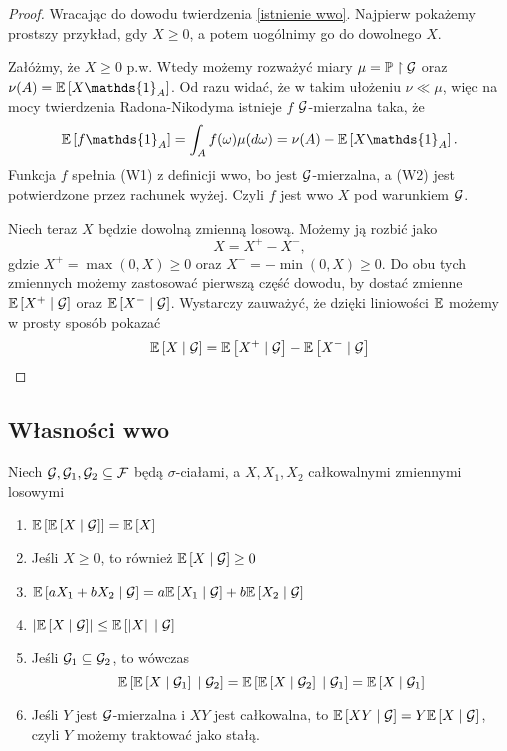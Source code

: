 \begin{proof}
  Wracając do dowodu twierdzenia \ref{istnienie wwo}. Najpierw pokażemy prostszy przykład, gdy $X\geq0$, a potem uogólnimy go do dowolnego $X$.

  Załóżmy, że $X\geq0$ p.w. Wtedy możemy rozważyć miary $\mu=\prob\restriction\set{G}$ oraz $\nu(A)=\expected{X\mathds{1}_A}$. Od razu widać, że w takim ułożeniu $\nu\ll\mu$, więc na mocy twierdzenia Radona-Nikodyma istnieje $f$ $\mathcal{G}$-mierzalna taka, że
  $$\expected{f\mathds{1}_A}=\int_Af(\omega)\mu(d\omega)=\nu(A)-\expected{X\mathds{1}_A}.$$
  Funkcja $f$ spełnia (W1) z definicji wwo, bo jest $\mathcal{G}$-mierzalna, a (W2) jest potwierdzone przez rachunek wyżej. Czyli $f$ jest wwo $X$ pod warunkiem $\mathcal{G}$.

  Niech teraz $X$ będzie dowolną zmienną losową. Możemy ją rozbić jako 
  $$X=X^+-X^-,$$ 
  gdzie $X^+=\max(0,X)\geq0$ oraz $X^-=-\min(0,X)\geq0$. Do obu tych zmiennych możemy zastosować pierwszą część dowodu, by dostać zmienne $\expected{X^+}{\set{G}}$ oraz $\expected{X^-}{\set{G}}$. Wystarczy zauważyć, że dzięki liniowości $\expected$ możemy w prosty sposób pokazać
  $$\expected{X}{\set{G}}=\expected{X^+}{\set{G}}-\expected{X^-}{\set{G}}$$
\end{proof}

\subsection{Własności wwo}

\begin{theorem}
  Niech $\mathcal{G},\mathcal{G}_1,\mathcal{G}_2\subseteq\mathcal{F}$ będą $\sigma$-ciałami, a $X,X_1,X_2$ całkowalnymi zmiennymi losowymi
  \begin{enumerate}[topsep=8pt, parsep=8pt]
    \item $\expected{\expected{X}{\set{G}}}=\expected{X}$
    \item Jeśli $X\geq0$, to również $\expected{X}{\set{G}}\geq0$
    \item $\expected{aX_1+bX_2}{\set{G}}=a\expected{X_1}{\set{G}}+b\expected{X_2}{\set{G}}$
    \item $\left| \expected{X}{\set{G}} \right| \leq \expected{\left| X\right| }{\set{G}}$
    \item Jeśli $\mathcal{G}_1\subseteq\mathcal{G}_2$, to wówczas
      $$\expected{\expected{X}{\set{G}_1}}{\set{G}_2}=\expected{\expected{X}{\set{G}_2}}{\set{G}_1}=\expected{X}{\set{G}_1}$$
    \item Jeśli $Y$ jest $\mathcal{G}$-mierzalna i $XY$ jest całkowalna, to $\expected{XY}{\set{G}}=Y\expected{X}{\set{G}}$, czyli $Y$ możemy traktować jako stałą.
  \end{enumerate}
\end{theorem}
